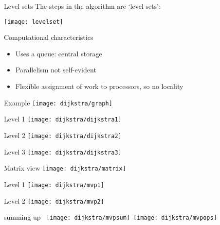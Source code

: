 \begin{numberedframe}{Level sets}
  The steps in the algorithm are `level sets':

  \texttt{[image: levelset]}  
\end{numberedframe}

\begin{numberedframe}{Computational characteristics}
  \begin{itemize}
  \item Uses a queue: central storage
  \item Parallelism not self-evident
  \item Flexible assignment of work to processors, so no locality
  \end{itemize}
\end{numberedframe}

\begin{numberedframe}{Example}
  \texttt{[image: dijkstra/graph]}
\end{numberedframe}

\begin{numberedframe}{Level 1}
  \texttt{[image: dijkstra/dijkstra1]}
\end{numberedframe}

\begin{numberedframe}{Level 2}
  \texttt{[image: dijkstra/dijkstra2]}
\end{numberedframe}

\begin{numberedframe}{Level 3}
  \texttt{[image: dijkstra/dijkstra3]}
\end{numberedframe}

\begin{numberedframe}{Matrix view}
  \texttt{[image: dijkstra/matrix]}
\end{numberedframe}

\begin{numberedframe}{Level 1}
  \texttt{[image: dijkstra/mvp1]}
\end{numberedframe}

\begin{numberedframe}{Level 2}
  \texttt{[image: dijkstra/mvp2]}
\end{numberedframe}

\begin{numberedframe}{summing up}
  \hbox\bgroup
  \texttt{[image: dijkstra/mvpsum]}
  \texttt{[image: dijkstra/mvpops]}
  \egroup
\end{numberedframe}



